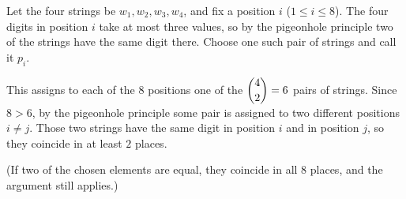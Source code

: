 Let the four strings be $w_1,w_2,w_3,w_4$, and fix a position $i$ ($1\le i\le8$). The four digits in position $i$ take at most three values, so by the pigeonhole principle two of the strings have the same digit there. Choose one such pair of strings and call it $p_i$.

This assigns to each of the $8$ positions one of the $\dbinom42=6$ pairs of strings. Since $8>6$, by the pigeonhole principle some pair is assigned to two different positions $i\ne j$. Those two strings have the same digit in position $i$ and in position $j$, so they coincide in at least $2$ places.

(If two of the chosen elements are equal, they coincide in all $8$ places, and the argument still applies.)
